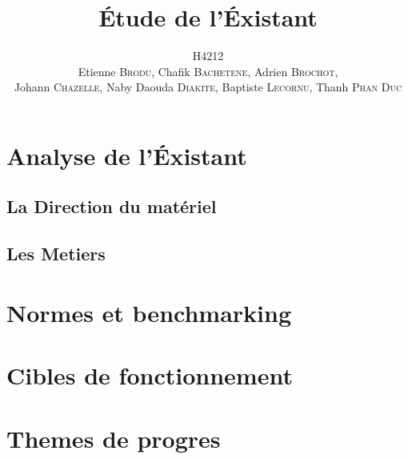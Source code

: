 \documentclass[a4paper,11pt]{report}
\title{\'Etude de l'\'Existant}
\author{H4212\\Etienne \textsc{Brodu}, Chafik \textsc{Bachetene}, Adrien \textsc{Brochot},\\Johann \textsc{Chazelle}, Naby Daouda \textsc{Diakite}, Baptiste \textsc{Lecornu}, Thanh \textsc{Phan Duc}}
\begin{document}
\maketitle
\newpage

\tableofcontents
\newpage

\part{Analyse de l'\'Existant}
	\chapter{La Direction du matériel}
		
	\chapter{Les Metiers}
		
		
		

\part{Normes et benchmarking}
    

\part{Cibles de fonctionnement}
%    

\part{Themes de progres}
%    
\end{document}
